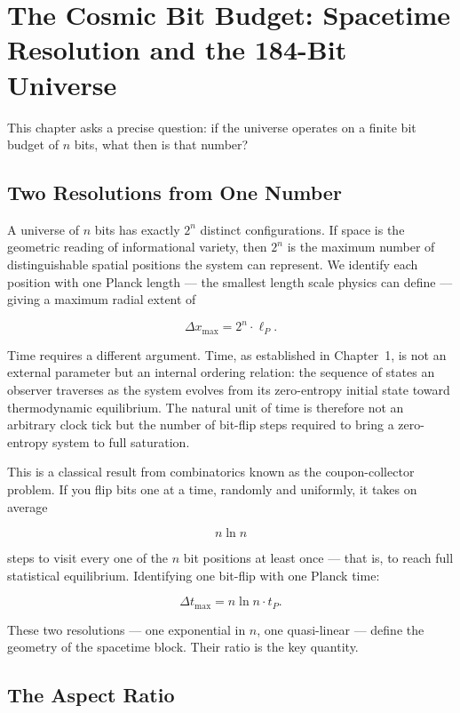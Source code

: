 \chapter{The Cosmic Bit Budget: Spacetime Resolution and the 184-Bit Universe}

This chapter asks a precise question: if the universe operates on a finite
bit budget of $n$ bits, what then is that number?

\section{Two Resolutions from One Number}

A universe of $n$ bits has exactly $2^n$ distinct configurations. If space
is the geometric reading of informational variety, then $2^n$ is the maximum
number of distinguishable spatial positions the system can represent. We
identify each position with one Planck length --- the smallest length scale
physics can define --- giving a maximum radial extent of

\[
\Delta x_{\max} = 2^n \cdot \ell_P.
\]

Time requires a different argument. Time, as established in Chapter~1, is
not an external parameter but an internal ordering relation: the sequence of
states an observer traverses as the system evolves from its zero-entropy
initial state toward thermodynamic equilibrium. The natural unit of time is
therefore not an arbitrary clock tick but the number of bit-flip steps
required to bring a zero-entropy system to full saturation.

This is a classical result from combinatorics known as the coupon-collector
problem. If you flip bits one at a time, randomly and uniformly, it takes on
average

\[
n \ln n
\]

steps to visit every one of the $n$ bit positions at least once --- that is,
to reach full statistical equilibrium. Identifying one bit-flip with one
Planck time:

\[
\Delta t_{\max} = n \ln n \cdot t_P.
\]

These two resolutions --- one exponential in $n$, one quasi-linear --- define
the geometry of the spacetime block. Their ratio is the key quantity.

\section{The Aspect Ratio}

